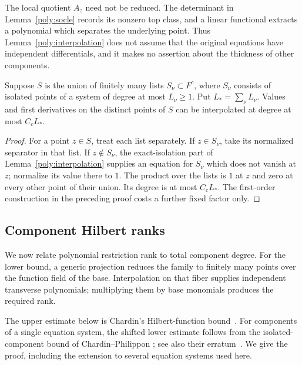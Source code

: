 \begin{remark}\label{poly:no-thickness-assumption}
The local quotient $A_z$ need not be reduced.  The determinant in
Lemma~\ref{poly:socle} records its nonzero top class, and a linear
functional extracts a polynomial which separates the underlying point.
Thus Lemma~\ref{poly:interpolation} does not assume that the original
equations have independent differentials, and it makes no assertion
about the thickness of other components.
\end{remark}

\begin{lemma}
\label{poly:union-interpolation}
Suppose $S$ is the union of finitely many lists $S_\nu\subset F^c$,
where $S_\nu$ consists of isolated points of a system of degree at most
$L_\nu\ge1$.  Put $L_*=\sum_\nu L_\nu$.  Values and first derivatives
on the distinct points of $S$ can be interpolated at degree at most
$C_cL_*$.
\end{lemma}

\begin{proof}
For a point $z\in S$, treat each list separately.  If $z\in S_\nu$,
take its normalized separator in that list.  If $z\notin S_\nu$,
the exact-isolation part of Lemma~\ref{poly:interpolation} supplies an
equation for $S_\nu$ which does not vanish at $z$; normalize its value
there to $1$.  The product over the lists is $1$ at $z$ and zero at every
other point of their union.  Its degree is at most $C_cL_*$.  The
first-order construction in the preceding proof costs a further fixed
factor only.
\end{proof}

\subsection{Component Hilbert ranks}

We now relate polynomial restriction rank to total component degree.
For the lower bound, a generic projection reduces the family to finitely
many points over the function field of the base.  Interpolation on that
fiber supplies independent transverse polynomials; multiplying them by
base monomials produces the required rank.

The upper estimate below is Chardin's Hilbert-function
bound~\cite{chardin1989}. For components of a single equation system,
the shifted lower estimate follows from the isolated-component bound
of Chardin--Philippon
\cite[Corollary~3]{chardinphilippon1999}; see also their
erratum~\cite{chardinphilippon2002erratum}. We give the proof, including
the extension to several equation systems used here.

